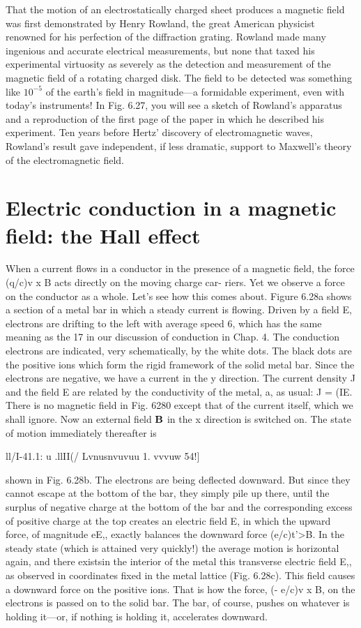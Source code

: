 That the motion of an electrostatically charged sheet produces a
magnetic field was first demonstrated by Henry Rowland, the great
American physicist renowned for his perfection of the diffraction
grating. Rowland made many ingenious and accurate electrical
measurements, but none that taxed his experimental virtuosity as
severely as the detection and measurement of the magnetic field of
a rotating charged disk. The field to be detected was something like
$10^{-5}$ of the earth's field in magnitude---a formidable experiment,
even with today's instruments! In Fig. 6.27, you will see a sketch
of Rowland's apparatus and a reproduction of the first page of the
paper in which he described his experiment. Ten years before Hertz'
discovery of electromagnetic waves, Rowland's result gave 
independent, if less dramatic, support to Maxwell's theory of the electromagnetic
field.

\iffalse

\section{Electric conduction in a magnetic field: the Hall effect}

When a current flows in a conductor in the presence of a magnetic
field, the force (q/c)v x B acts directly on the moving charge car-
riers. Yet we observe a force on the conductor as a whole. Let's
see how this comes about. Figure 6.28a shows a section of a metal
bar in which a steady current is flowing. Driven by a field E, electrons
are drifting to the left with average speed 6, which has the same
meaning as the 17 in our discussion of conduction in Chap. 4. The
conduction electrons are indicated, very schematically, by the white
dots. The black dots are the positive ions which form the rigid framework
of the solid metal bar. Since the electrons are negative, we have
a current in the y direction. The current density J and the field E
are related by the conductivity of the metal, a, as usual: J = (IE.
There is no magnetic field in Fig. 6280 except that of the current
itself, which we shall ignore. Now an external field $\mathbf{B}$ in the x direction
is switched on. The state of motion immediately thereafter is

\/ll/I-41.1: u .llII(/ Lvnusnvuvuu 1. vvvuw 54!]

shown in Fig. 6.28b. The electrons are being deflected downward.
But since they cannot escape at the bottom of the bar, they simply
pile up there, until the surplus of negative charge at the bottom of the
bar and the corresponding excess of positive charge at the top creates
an electric field E, in which the upward force, of magnitude eE,,
exactly balances the downward force (e/c)t'>B. In the steady state
(which is attained very quickly!) the average motion is horizontal
again, and there existsin the interior of the metal this transverse
electric field E,, as observed in coordinates fixed in the metal lattice
(Fig. 6.28c). This field causes a downward force on the positive
ions. That is how the force, (- e/c)v x B, on the electrons is passed
on to the solid bar. The bar, of course, pushes on whatever is holding
it---or, if nothing is holding it, accelerates downward.

